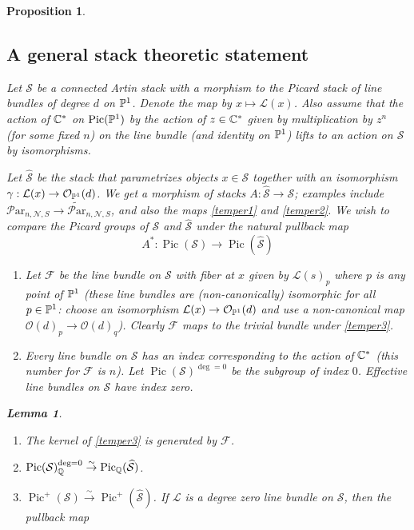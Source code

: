 \documentclass[11pt]{amsart}
\newcommand\mf{\mathcal{F}}
\newcommand\Pic{\operatorname{Pic}}
\newcommand\ml{\mathcal{L}}
\newcommand\ms{\mathcal{S}}
\newcommand\mn{\mathcal{N}}
\newcommand\Par{\mathcal{P}\text{ar} }
\newcommand{\leto}[1]{\stackrel{#1}{\to}}
\newtheorem{proposition}[theorem]{Proposition}
\newtheorem{lemma}[theorem]{Lemma}
\numberwithin{theorem}{subsection}
\begin{document}
{\begin{proposition}
\subsection{A general stack theoretic statement}
Let ${\ms}$ be a connected Artin stack with a morphism to the Picard stack of line bundles of degree $d$ on  $\Bbb{P}^1$. Denote the map by $x\mapsto \ml(x)$. Also assume that the action of $\Bbb{C}^*$ on $\Pic(\Bbb{P}^1)$ by the action of $z\in \Bbb{C}^*$ given by multiplication by $z^n$ (for some fixed $n$) on the line bundle (and identity on $\Bbb{P}^1$) lifts to an action on ${\ms}$ by isomorphisms.

Let $\widehat{\ms}$ be the stack that parametrizes objects $x\in {\mathcal{S}}$ together with an isomorphism $\gamma:\ml(x)\to\mathcal{O}_{\Bbb{P}^1}(d)$.
We get a morphism of stacks $A:\widehat{\ms}\to{\ms}$; examples include    ${\Par}_{n,\mn,S}\to  \widetilde{\Par}_{n,\mn,S}$, and also the maps \eqref{temper1} and \eqref{temper2}.
We wish to compare the Picard groups of $\ms$ and $\widehat{\ms}$ under the natural  pullback map 
\begin{equation}\label{temper3}
A^*:\Pic({\ms})\to \Pic(\widehat{\ms})
\end{equation}
\begin{enumerate}
\item Let $\mf$ be the line bundle on ${\mathcal{S}}$ with fiber at $x$ given by $\ml(s)_p$ where $p$ is any point of $\Bbb{P}^1$ (these line bundles are (non-canonically) isomorphic for all $p\in\Bbb{P}^1$: choose an isomorphism $\ml(x)\to \mathcal{O}_{\Bbb{P}^1}(d)$ and use a non-canonical map $\mathcal{O}(d)_p\to \mathcal{O}(d)_q$). Clearly $\mf$ maps to the trivial bundle under \eqref{temper3}.
\item Every line bundle on ${\ms}$ has an index corresponding to the action of $\Bbb{C}^*$ (this number for $\mf$ is $n$). Let $\Pic({\ms})^{\deg=0}$ be the subgroup of index $0$. Effective line bundles on ${\ms}$ have index zero.
\end{enumerate}
\begin{lemma}\label{mass2}
\hspace{2cm}
\begin{enumerate}
\item[(i)]The kernel of \eqref{temper3} is generated by $\mf$.
\item[(ii)] $\Pic({\ms})^{\deg=0}_{\Bbb{Q}}\leto{\sim} \Pic_{\Bbb{Q}}(\widehat{\ms})$.
\item[(iii)] $\Pic^+({\ms})\leto{\sim} \Pic^+(\widehat{\ms})$. If $\ml$ is a degree zero  line bundle on ${\ms}$, then the pullback map

\end{enumerate}
\end{lemma}
\end{proposition}}
\end{document}
